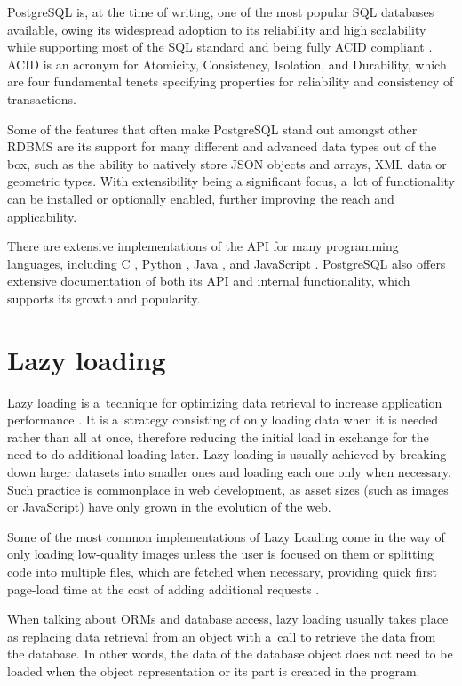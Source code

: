PostgreSQL is, at the time of writing, one of the most popular SQL databases
available, owing its widespread adoption to its reliability and high scalability
while supporting most of the SQL standard and being fully ACID compliant
\cite{postgres-transaction}. ACID is an acronym for Atomicity, Consistency,
Isolation, and Durability, which are four fundamental tenets specifying
properties for reliability and consistency of transactions.

Some of the features that often make PostgreSQL stand out amongst other RDBMS
are its support for many different and advanced data types
\cite{postgres-datatypes} out of the box, such as the ability to natively store
JSON objects and arrays, XML data or geometric types. With extensibility being a
significant focus, a~lot of functionality can be installed or optionally
enabled, further improving the reach and applicability.

There are extensive implementations of the API for many programming languages,
including C \cite{libpq}, Python \cite{psycopg2}, Java \cite{pgJDBC}, and
JavaScript \cite{node-postgres}. PostgreSQL also offers extensive documentation
of both its API and internal functionality, which supports its growth and
popularity.

\section*{Lazy loading}
Lazy loading is a~technique for optimizing data retrieval to increase
application performance \cite[p.~200]{fowler-patterns-2003}. It is a~strategy consisting of
only loading data when it is needed rather than all at once, therefore reducing
the initial load in exchange for the need to do additional loading later. Lazy
loading is usually achieved by breaking down larger datasets into smaller ones
and loading each one only when necessary. Such practice is commonplace in web
development, as asset sizes (such as images or JavaScript) have only grown in
the evolution of the web.

Some of the most common implementations of Lazy Loading come in the way of only
loading low-quality images unless the user is focused on them or splitting code
into multiple files, which are fetched when necessary, providing quick first
page-load time at the cost of adding additional requests
\cite{webPerformanceMDN}.

When talking about ORMs and database access, lazy loading usually takes place as
replacing data retrieval from an object with a~call to retrieve the data from
the database. In other words, the data of the database object does not need to
be loaded when the object representation or its part is created in the program.

